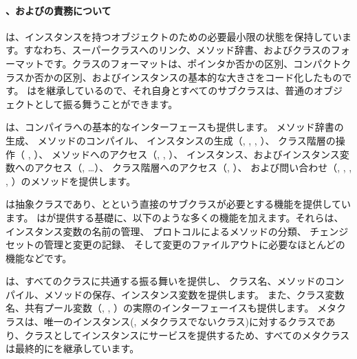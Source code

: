 \documentclass[a4paper,10pt,twoside]{book}
\begin{document}

\paragraph{、およびの責務について}
は、インスタンスを持つオブジェクトのための必要最小限の状態を保持しています。すなわち、スーパークラスへのリンク、メソッド辞書、およびクラスのフォーマットです。クラスのフォーマットは、ポインタか否かの区別、コンパクトクラスか否かの区別、およびインスタンスの基本的な大きさをコード化したものです。
はを継承しているので、それ自身とすべてのサブクラスは、普通のオブジェクトとして振る舞うことができます。

は、コンパイラへの基本的なインターフェースも提供します。
メソッド辞書の生成、
メソッドのコンパイル、
インスタンスの生成（\ie {}, , , ）、
クラス階層の操作（\ie {} , ）、
メソッドへのアクセス（\ie {}, , ）、
インスタンス、およびインスタンス変数へのアクセス（\ie {}, \ldots）、
クラス階層へのアクセス（\ie {}, ）、
および問い合わせ（\ie {}, , , , ）のメソッドを提供します。


は抽象クラスであり、とという直接のサブクラスが必要とする機能を提供しています。
はが提供する基礎に、以下のような多くの機能を加えます。それらは、
インスタンス変数の名前の管理、
プロトコルによるメソッドの分類、
チェンジセットの管理と変更の記録、
そして変更のファイルアウトに必要なほとんどの機能などです。

は、すべてのクラスに共通する振る舞いを提供し、
クラス名、メソッドのコンパイル、メソッドの保存、インスタンス変数を提供します。
また、クラス変数名、共有プール変数（, , ）の実際のインターフェーイスも提供します。
メタクラスは、唯一のインスタンス(\ie, メタクラスでないクラス)に対するクラスであり、クラスとしてインスタンスにサービスを提供するため、すべてのメタクラスは最終的にを継承しています。
\end{document}
